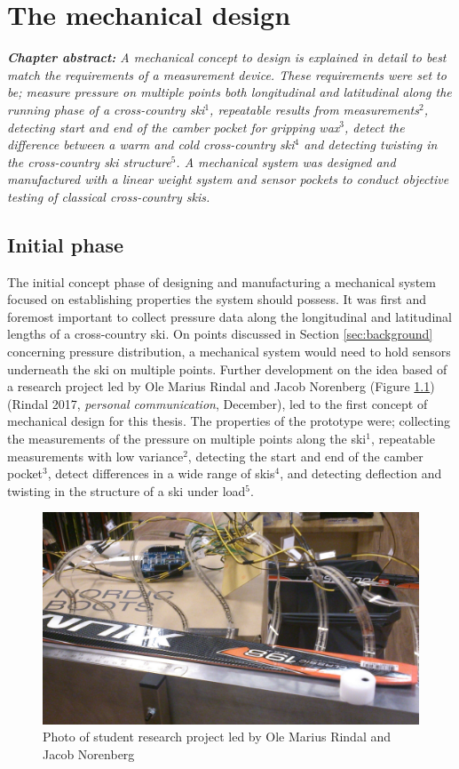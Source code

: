 \chapter{The mechanical design}
\label{sec:mechanicaldesign}
\textit{\textbf{Chapter abstract:} A mechanical concept to design is explained in detail to best match the requirements of a measurement device. These requirements were set to be; measure pressure on multiple points both longitudinal and latitudinal along the running phase of a cross-country ski$^1$, repeatable results from measurements$^2$, detecting start and end of the camber pocket for gripping wax$^3$, detect the difference between a warm and cold cross-country ski$^4$ and detecting twisting in the cross-country ski structure$^5$. A mechanical system was designed and manufactured with a linear weight system and sensor pockets to conduct objective testing of classical cross-country skis.}

\section{Initial phase}
\label{sec:initial}
The initial concept phase of designing and manufacturing a mechanical system focused on establishing properties the system should possess. It was first and foremost important to collect pressure data along the longitudinal and latitudinal lengths of a cross-country ski. On points discussed in Section \ref{sec:background} concerning pressure distribution, a mechanical system would need to hold sensors underneath the ski on multiple points. 
Further development on the idea based of a research project led by Ole Marius Rindal and Jacob Norenberg (Figure \ref{fig:earlyprototype})(Rindal 2017, \textit{personal communication}, December), led to the first concept of mechanical design for this thesis. The properties of the prototype were; collecting the measurements of the pressure on multiple points along the ski$^1$, repeatable measurements with low variance$^2$, detecting the start and end of the camber pocket$^3$, detect differences in a wide range of skis$^4$, and detecting deflection and twisting in the structure of a ski under load$^5$.

\begin{figure}[!b]
    \centering
    \includegraphics[scale=0.1415]{figures/prototype2.jpeg}
    \caption{Photo of student research project led by Ole Marius Rindal and Jacob Norenberg}
    \label{fig:earlyprototype}
\end{figure}


